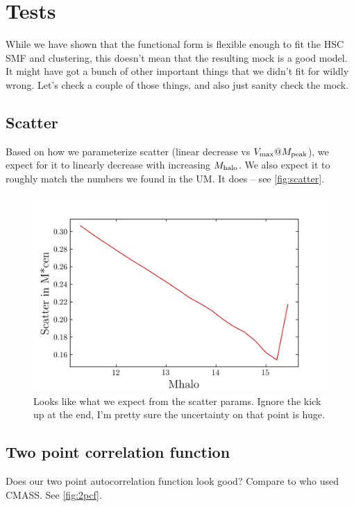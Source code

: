\documentclass{article}
\makeatletter
\newcommand{\Mhalo}{\ensuremath{M_{\rm halo}}}
\newcommand{\vmp}{\ensuremath{V_{\rm max}@M_{\rm peak}}}
\makeatother
\begin{document}
\section{Tests}

While we have shown that the functional form is flexible enough to fit the HSC SMF and clustering, this doesn't mean that the resulting mock is a good model. It might have got a bunch of other important things that we didn't fit for wildly wrong. Let's check a couple of those things, and also just sanity check the mock.


\subsection{Scatter}
Based on how we parameterize scatter (linear decrease vs \vmp{}), we expect for it to linearly decrease with increasing \Mhalo{}. We also expect it to roughly match the numbers we found in the UM. It does -- see \autoref{fig:scatter}.

\begin{figure}[h]
    \includegraphics[width=\textwidth]{images/scatter_mcen_mhalo.png}
    \caption{Looks like what we expect from the scatter params. Ignore the kick up at the end, I'm pretty sure the uncertainty on that point is huge.
    \label{fig:scatter}
}
\end{figure}


\subsection{Two point correlation function}

Does our two point autocorrelation function look good? Compare to \cite{Tinker2017} who used CMASS. See \autoref{fig:2pcf}.
\end{document}
